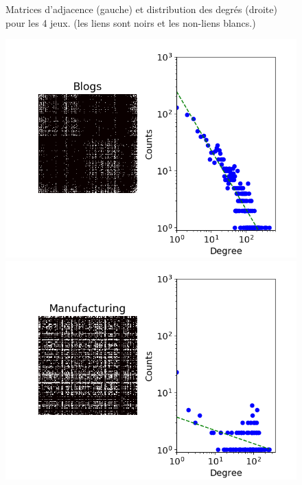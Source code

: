\documentclass[french]{hermes-journal}
\begin{document}
\begin{figure}[h] {Matrices d'adjacence (gauche) et distribution des degrés (droite) pour les 4 jeux. (les liens sont noirs et les non-liens blancs.)}
\begin{minipage}{0.35\textwidth}
            \includegraphics[width=1.1\textwidth]{img/corpus/blogs_dd}
        \end{minipage}
        \begin{minipage}{0.35\textwidth}
            \includegraphics[width=1.1\textwidth]{img/corpus/manufacturing_dd}
        \end{minipage}
	\label{fig:corpuses}
\end{figure}
\end{document}
